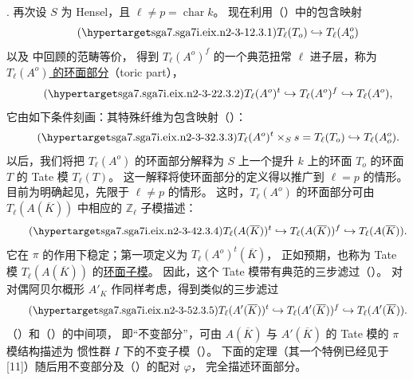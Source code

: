 \medskip
\noindent
{}. 再次设 $S$ 为 Hensel，且 $\ell\ne p=\operatorname{char}k$。
现在利用（）中的包含映射
\begin{equation}\tag{\SGARefTarget{sga7.sga7i.eix.n2-3-1}{2.3.1}}
 T_\ell(T_o)\hookrightarrow T_\ell(A_o^o)
\end{equation}
以及  中回顾的范畴等价，
得到 $T_\ell(A^o)^f$ 的一个典范扭常 $\ell$ 进子层，称为 \underline{$T_\ell(A^o)$ 的环面部分}（toric part），
\begin{equation}\tag{\SGARefTarget{sga7.sga7i.eix.n2-3-2}{2.3.2}}
 T_\ell(A^o)^t\hookrightarrow T_\ell(A^o)^f
 \hookrightarrow T_\ell(A^o),
\end{equation}
它由如下条件刻画：其特殊纤维为包含映射（）：
\begin{equation}\tag{\SGARefTarget{sga7.sga7i.eix.n2-3-3}{2.3.3}}
 T_\ell(A^o)^t\times_Ss=T_\ell(T_o)
 \hookrightarrow T_\ell(A_o^o).
\end{equation}
以后，我们将把 $T_\ell(A^o)$ 的环面部分解释为 $S$ 上一个提升 $k$ 上的环面 $T_o$ 的环面 $T$ 的 Tate 模 $T_\ell(T)$。
这一解释将使环面部分的定义得以推广到 $\ell=p$ 的情形。
目前为明确起见，先限于 $\ell\ne p$ 的情形。
这时，$T_\ell(A^o)$ 的环面部分可由 $T_\ell(A(\overline K))$ 中相应的 $\mathbb Z_\ell$ 子模描述：
\begin{equation}\tag{\SGARefTarget{sga7.sga7i.eix.n2-3-4}{2.3.4}}
 T_\ell(A(\overline K))^t\hookrightarrow
 T_\ell(A(\overline K))^f\hookrightarrow
 T_\ell(A(\overline K)).
\end{equation}
它在 $\pi$ 的作用下稳定；第一项定义为 $T_\ell(A^o)^t(\overline K)$，
正如预期，也称为 Tate 模 $T_\ell(A(\overline K))$ 的\underline{环面子模}。
因此，这个 Tate 模带有典范的三步滤过（）。
对对偶阿贝尔概形 $A'_K$ 作同样考虑，得到类似的三步滤过
\begin{equation}\tag{\SGARefTarget{sga7.sga7i.eix.n2-3-5}{2.3.5}}
 T_\ell(A'(\overline K))^t\hookrightarrow
 T_\ell(A'(\overline K))^f\hookrightarrow
 T_\ell(A'(\overline K)).
\end{equation}
（）和（）的中间项，
即“不变部分”，可由 $A(\overline K)$ 与 $A'(\overline K)$ 的 Tate 模的 $\pi$ 模结构描述为
惯性群 $I$ 下的不变子模（）。
下面的定理（其一个特例已经见于 [11]）随后用不变部分及（）的配对 $\varphi$，
完全描述环面部分。

